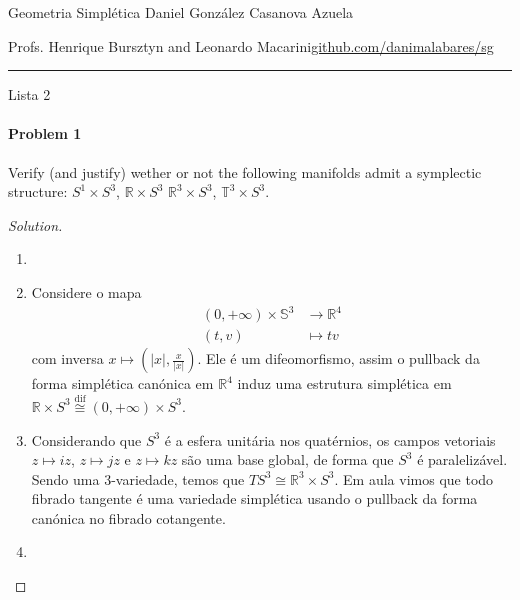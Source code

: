 


\usepackage[style=authortitle-terse,backend=bibtex]{biblatex}




\begin{minipage}{\textwidth}
	\begin{minipage}{1\textwidth}
		Geometria Simpl\'etica \hfill Daniel González Casanova Azuela
		
		{\small Profs. Henrique Bursztyn and Leonardo Macarini\hfill\href{https://github.com/danimalabares/sg}{github.com/danimalabares/sg}}
	\end{minipage}
\end{minipage}\vspace{.2cm}\hrule

\vspace{10pt}
{\huge Lista 2}

\paragraph{Problem 1} Verify (and justify) wether or not the following manifolds admit a symplectic structure: $S^{1}\times S^3$, $\mathbb{R}\times S^3$ $\mathbb{R}^{3}\times S^{3}$, $\mathbb{T}^3\times S^3$.

\begin{proof}[Solution]\leavevmode
	\begin{enumerate}[label=\alph*.]
		\item 

		\item Considere o mapa
			\begin{align*}
				(0,+\infty)\times \mathbb{S}^3 &\longrightarrow \mathbb{R}^4 \\
				(t,v) &\longmapsto tv
			\end{align*}
			com inversa $x\mapsto \left( |x|,\frac{x}{|x|} \right)$. Ele \'e um difeomorfismo, assim o pullback da forma simpl\'etica can\'onica em $\mathbb{R}^{4}$ induz uma estrutura simpl\'etica em $\mathbb{R}\times S^3\overset{\operatorname{dif}}{\cong} (0,+\infty)\times S^3$.

		\item Considerando que $S^3$ \'e a esfera unit\'aria nos quat\'ernios, os campos vetoriais $z\mapsto iz$, $z\mapsto jz$ e $z\mapsto kz$ s\~ao uma base global, de forma que $S^3$ \'e paraleliz\'avel. Sendo uma 3-variedade, temos que $TS^3\cong \mathbb{R}^{3}\times S^3$. Em aula vimos que todo fibrado tangente \'e uma variedade simpl\'etica usando o pullback da forma can\'onica no fibrado cotangente.

		\item 
	\end{enumerate}
\end{proof}

